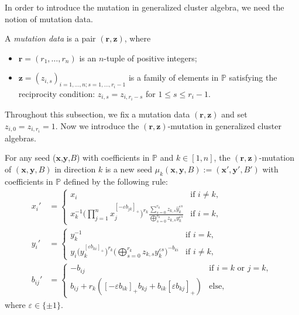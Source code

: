 \documentclass[11pt]{article}
\numberwithin{equation}{section}
\numberwithin{equation}{section}
\begin{document}
In order to introduce the mutation in generalized cluster algebra, we need the notion of mutation data.
\begin{Definition}\label{D5}
 A {\it mutation data} is a pair $(\mathbf{r},\mathbf{z})$, where
 \begin{itemize}\itemsep=0pt
 \item $\mathbf{r}=(r_1,\dots,r_n)$ is an $n$-tuple of positive integers;
 \item $\mathbf{z}=(z_{i,s})_{i=1,\dots,n;s=1,\dots,r_{i}-1}$ is a family of elements in $\mathbb{P}$ satisfying the reciprocity condition: $z_{i,s}=z_{i,r_i-s}$ for $1\leq s\leq r_{i}-1$.
 \end{itemize}
\end{Definition}
Throughout this subsection, we fix a mutation data $(\mathbf{r},\mathbf{z})$ and set $z_{i,0}=z_{i,r_i}=1$. Now we introduce the $(\mathbf{r},\mathbf{z})$-mutation in generalized cluster algebras.
\begin{Definition}\label{D6}
 For any seed ($\mathbf{x}$,$\mathbf{y}$,$B$) with coefficients in $\mathbb{P}$ and $k\in[1,n]$, the $(\mathbf{r},\mathbf{z})$-mutation of $(\mathbf{x},\mathbf{y},B)$ in direction $k$ is a new seed $\mu_k(\mathbf{x},\mathbf{y},B):=(\mathbf{x}',\mathbf{y}',B') $ with coefficients in $\mathbb{P}$ defined by the following rule:
\begin{align}
x_i'&=
\begin{cases}
 x_i & \text{if $i\neq k$}, \\
 \displaystyle x_k^{-1}\biggl(\prod\limits_{j=1}^{n}x_j^{[-\varepsilon b_{jk}]_+}\biggr)^{r_k}\frac{\sum\limits_{s=0}^{r_k}z_{k,s}\hat{y}_k^{\varepsilon s}}{\mathop{\bigoplus}\limits_{s=0}^{r_k}z_{k,s}y_k^{\varepsilon s}}& \text{if $i=k$},
\end{cases}\label{E4}
\\
 y_i'&=
\begin{cases}
 y_k^{-1} & \text{if $i= k$}, \\
\displaystyle y_i\bigl(y_k^{[\varepsilon b_{ki}]_+}\bigr)^{r_k}\biggl(\mathop{\bigoplus}\limits_{s=0}^{r_k}z_{k,s}y_k^{\varepsilon s}\biggr)^{-b_{ki}}& \text{if $i\neq k$},
\end{cases}\label{E5}
 \\
 b_{ij}'&=
 \begin{cases}
-b_{ij} &\text{if $i=k$ or $j=k$},\\
b_{ij}+r_k([-\varepsilon b_{ik}]_+b_{kj}+b_{ik}[\varepsilon b_{kj}]_+) &\text{else},
\end{cases}\label{E6}
\end{align}
where $\varepsilon\in\{\pm 1\}$.
\end{Definition}
\end{document}
